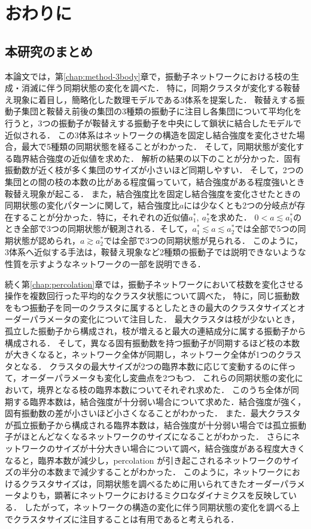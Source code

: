 \documentclass[../main]{subfiles}
\begin{document}
\chapter{おわりに}
\label{chap:summary}
\section{本研究のまとめ}
本論文では，第\ref{chap:method-3body}章で，振動子ネットワークにおける枝の生成・消滅に伴う同期状態の変化を調べた．
特に，同期クラスタが変化する鞍替え現象に着目し，簡略化した数理モデルである3体系を提案した．
鞍替えする振動子集団と鞍替え前後の集団の3種類の振動子に注目し各集団について平均化を行うと，3つの振動子が鞍替えする振動子を中央にして鎖状に結合したモデルで近似される．
この3体系はネットワークの構造を固定し結合強度を変化させた場合，最大で5種類の同期状態を経ることがわかった．
そして，同期状態が変化する臨界結合強度の近似値を求めた．
解析の結果の以下のことが分かった．固有振動数が近く枝が多く集団のサイズが小さいほど同期しやすい．
そして，2つの集団との間の枝の本数の比がある程度偏っていて，結合強度がある程度強いとき鞍替え現象が起こる．
また，結合強度比を固定し結合強度を変化させたときの同期状態の変化パターンに関して，結合強度比$a$には少なくとも2つの分岐点が存在することが分かった．特に，それぞれの近似値$a^\ast_1,\ a^\ast_2$を求めた．
$0<a\lesssim a^\ast_1$のとき全部で3つの同期状態が観測される．そして，$a^\ast_1\lesssim a\lesssim a^\ast_2$では全部で5つの同期状態が認められ，$a\gtrsim a^\ast_2$では全部で3つの同期状態が見られる．
このように，3体系へ近似する手法は，鞍替え現象など2種類の振動子では説明できないような性質を示すようなネットワークの一部を説明できる．

続く第\ref{chap:percolation}章では，振動子ネットワークにおいて枝数を変化させる操作を複数回行った平均的なクラスタ状態について調べた，
特に，同じ振動数をもつ振動子を同一のクラスタに属するとしたときの最大のクラスタサイズとオーダーパラメータの変化について注目した．
最大クラスタは枝が少ないとき，孤立した振動子から構成され，枝が増えると最大の連結成分に属する振動子から構成される．
そして，異なる固有振動数を持つ振動子が同期するほど枝の本数が大きくなると，ネットワーク全体が同期し，ネットワーク全体が1つのクラスタとなる．
クラスタの最大サイズが2つの臨界本数に応じて変動するのに伴って，オーダーパラメータも変化し変曲点を2つもつ．
これらの同期状態の変化において，境界となる枝の臨界本数についてそれぞれ求めた．
このうち全体が同期する臨界本数は，結合強度が十分弱い場合について求めた．結合強度が強く，固有振動数の差が小さいほど小さくなることがわかった．
また．最大クラスタが孤立振動子から構成される臨界本数は，結合強度が十分弱い場合では孤立振動子がほとんどなくなるネットワークのサイズになることがわかった．
さらにネットワークのサイズが十分大きい場合について調べ，結合強度がある程度大きくなると，臨界本数が減少し，percolation が引き起こされるネットワークのサイズの半分の本数まで減少することがわかった．
このように，ネットワークにおけるクラスタサイズは，同期状態を調べるために用いられてきたオーダーパラメータよりも，顕著にネットワークにおけるミクロなダイナミクスを反映している．
したがって，ネットワークの構造の変化に伴う同期状態の変化を調べる上でクラスタサイズに注目することは有用であると考えられる．
\end{document}
